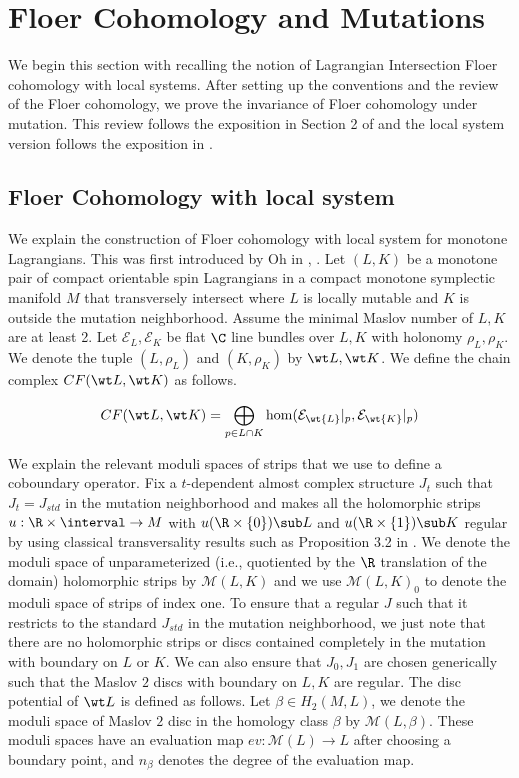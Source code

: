 \section{Floer Cohomology and Mutations}\label{sec:floerhomo}
We begin this section with recalling the notion of Lagrangian Intersection Floer cohomology with local systems. After setting up the conventions and the review of the Floer cohomology, we prove the invariance of Floer cohomology under mutation. This review follows the exposition in Section 2 of \cite{wall} and the local system version follows the exposition in \cite{aurBeg}. 

\subsection{Floer Cohomology with local system} \label{subsec:flohomloc}

We explain the construction of Floer cohomology with local system for monotone Lagrangians. This was first introduced by Oh in \cite{ohMonotone}, \cite{oh:addendum}. Let $(L,K)$ be a monotone pair of compact orientable spin Lagrangians in a compact monotone symplectic manifold $M$ that transversely intersect where $L$ is locally mutable and $K$ is outside the mutation neighborhood. Assume the minimal Maslov number of $L,K$ are at least 2. Let $\mathcal{E}_L,\mathcal{E}_K$ be flat $\C$ line bundles over $L,K$ with holonomy $\rho_L,\rho_K $. We denote the tuple $(L,\rho_L)$ and $(K,\rho_K)$ by $\wt L , \wt K$. We define the chain complex  $CF(\wt L, \wt K)$ as follows.

\begin{equation*}
    CF(\wt L, \wt K) = \bigoplus_{p\in L \cap K} \hom(\mathcal{E}_{\wt {L}}|_p,\mathcal{E}_{\wt {K}}|_p )
\end{equation*}

We explain the relevant moduli spaces of strips that we use to define a coboundary operator. Fix a $t$-dependent almost complex structure $J_t$ such that $J_t=J_{std}$ in the mutation neighborhood and makes all the holomorphic strips $u:\R \times \interval \to M$ with $u(\R \times \{0\})\sub L$ and $u(\R \times \{1\})\sub K$ regular by using classical transversality results such as Proposition 3.2 in \cite{ohMonotone}.  We denote the moduli space of unparameterized (i.e., quotiented by the $\R$ translation of the domain) holomorphic strips by $\mathcal{M}(L,K)$ and we use $\mathcal{M}(L,K)_0$ to denote the moduli space of strips of index one. To ensure that a regular $J$ such that it restricts to the standard $J_{std}$ in the mutation neighborhood, we just note that there are no holomorphic strips or discs contained completely in the mutation with boundary on $L$ or $K$. We can also ensure that $J_0,J_1$ are chosen generically such that the Maslov $2$ discs with boundary on $L,K$ are regular.   The disc potential of $\wt L$ is defined as follows. Let $\beta \in H_2(M,L)$, we denote the moduli space of Maslov $2$ disc in the homology class $\beta$  by $\mathcal{M}(L,
\beta)$.  These  moduli spaces have an evaluation map $ev : \mathcal{M}(L) \to L$ after choosing a boundary point, and $n_\beta$ denotes the degree of the evaluation map. 

